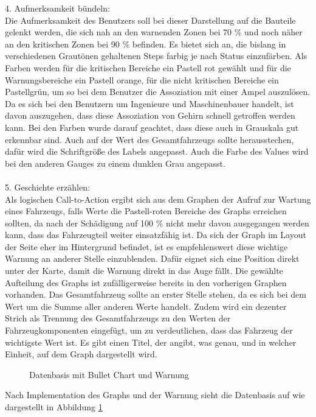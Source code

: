 4. Aufmerksamkeit bündeln:\\
Die Aufmerksamkeit des Benutzers soll bei dieser Darstellung auf die Bauteile gelenkt werden, die sich nah an den warnenden Zonen bei 70 \% und noch näher an den kritischen Zonen bei 90 \% befinden. Es bietet sich an, die bislang in verschiedenen Grautönen gehaltenen Steps farbig je nach Status einzufärben. Als Farben werden für die kritischen Bereiche ein Pastell rot gewählt und für die Warnungsbereiche ein Pastell orange, für die nicht kritischen Bereiche ein Pastellgrün, um so bei dem Benutzer die Assoziation mit einer Ampel auszulösen. Da es sich bei den Benutzern um Ingenieure und Maschinenbauer handelt, ist davon auszugehen, dass diese Assoziation von Gehirn schnell getroffen werden kann. Bei den Farben wurde darauf geachtet, dass diese auch in Grauskala gut erkennbar sind. Auch auf der Wert des Gesamtfahrzeugs sollte herausstechen, dafür wird die Schriftgröße des Labels angepasst. Auch die Farbe des Values wird bei den anderen Gauges zu einem dunklen Grau angepasst.\\\\
5. Geschichte erzählen:\\
Als logischen Call-to-Action ergibt sich aus dem Graphen der Aufruf zur Wartung eines Fahrzeugs, falls Werte die Pastell-roten Bereiche des Graphs erreichen sollten, da nach der Schädigung auf 100 \% nicht mehr davon ausgegangen werden kann, dass das Fahrzeugteil weiter einsatzfähig ist. Da sich der Graph im Layout der Seite eher im Hintergrund befindet, ist es empfehlenswert diese wichtige Warnung an anderer Stelle einzublenden. Dafür eignet sich eine Position direkt unter der Karte, damit die Warnung direkt in das Auge fällt. Die gewählte Aufteilung des Graphs ist zufälligerweise bereits in den vorherigen Graphen vorhanden. Das Gesamtfahrzeug sollte an erster Stelle stehen, da es sich bei dem Wert um die Summe aller anderen Werte handelt. Zudem wird ein dezenter Strich als Trennung des Gesamtfahrzeugs zu den Werten der Fahrzeugkomponenten eingefügt, um zu verdeutlichen, dass das Fahrzeug der wichtigste Wert ist. Es gibt einen Titel, der angibt, was genau, und in welcher Einheit, auf dem Graph dargestellt wird.
\begin{figure}[h!]
\centering
{}
\caption{Datenbasis mit Bullet Chart und Warnung}
\label{fig:datenbasis_after}
\end{figure}
\noindent
Nach Implementation des Graphs und der Warnung sieht die Datenbasis auf wie dargestellt in Abbildung \ref{fig:datenbasis_after}

